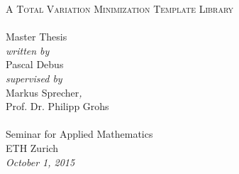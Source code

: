 \begin{titlepage}
\begin{center}
  \hfill
  \vspace{3.0cm}

  {\huge \textsc{A Total Variation Minimization Template Library\\[10pt]
  }}
  ~\\[20pt]

  {\huge{Master Thesis}}\\[2.5cm]

  {\emph{written by}}\\
  Pascal Debus
  \\[0.6cm]
  {\emph{supervised by}}\\
  Markus Sprecher{\emph{,}}\\
  Prof. Dr. Philipp Grohs\\
  \\[2.5cm]

  Seminar for Applied Mathematics\\
  ETH Zurich
  \\[0.5cm]
  \emph{{October 1, 2015}}
\end{center}
\end{titlepage}
